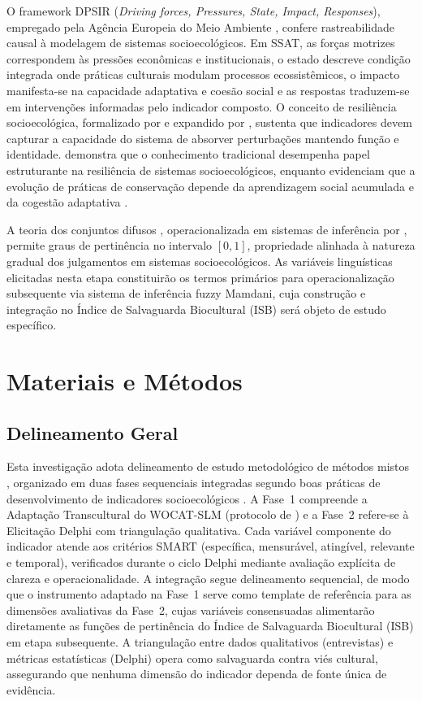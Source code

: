 \documentclass[3p,times]{elsarticle}
\begin{document}
O framework DPSIR (\textit{Driving forces, Pressures, State, Impact, Responses}), empregado pela Agência Europeia do Meio Ambiente \citep{Smeets1999}, confere rastreabilidade causal à modelagem de sistemas socioecológicos. Em SSAT, as forças motrizes correspondem às pressões econômicas e institucionais, o estado descreve condição integrada onde práticas culturais modulam processos ecossistêmicos, o impacto manifesta-se na capacidade adaptativa e coesão social e as respostas traduzem-se em intervenções informadas pelo indicador composto. O conceito de resiliência socioecológica, formalizado por \citet{Holling1973} e expandido por \citet{Folke2010}, sustenta que indicadores devem capturar a capacidade do sistema de absorver perturbações mantendo função e identidade. \citet{Folke2004} demonstra que o conhecimento tradicional desempenha papel estruturante na resiliência de sistemas socioecológicos, enquanto \citet{BerkesTurner2006} evidenciam que a evolução de práticas de conservação depende da aprendizagem social acumulada e da cogestão adaptativa \citep{OlssonFolkeBerkes2004}.

A teoria dos conjuntos difusos \citep{Zadeh1965}, operacionalizada em sistemas de inferência por \citet{Mamdani1975}, permite graus de pertinência no intervalo $[0,1]$, propriedade alinhada à natureza gradual dos julgamentos em sistemas socioecológicos. As variáveis linguísticas elicitadas nesta etapa constituirão os termos primários para operacionalização subsequente via sistema de inferência fuzzy Mamdani, cuja construção e integração no Índice de Salvaguarda Biocultural (ISB) será objeto de estudo específico.


\section{Materiais e Métodos}
\label{sec:methods}

\subsection{Delineamento Geral}

Esta investigação adota delineamento de estudo metodológico de métodos mistos \citep{Creswell2018}, organizado em duas fases sequenciais integradas segundo boas práticas de desenvolvimento de indicadores socioecológicos \citep{Dale2001,Niemeijer2008}. A Fase~1 compreende a Adaptação Transcultural do WOCAT-SLM (protocolo de \citet{Beaton2000}) e a Fase~2 refere-se à Elicitação Delphi com triangulação qualitativa. Cada variável componente do indicador atende aos critérios SMART (específica, mensurável, atingível, relevante e temporal), verificados durante o ciclo Delphi mediante avaliação explícita de clareza e operacionalidade. A integração segue delineamento sequencial, de modo que o instrumento adaptado na Fase~1 serve como template de referência para as dimensões avaliativas da Fase~2, cujas variáveis consensuadas alimentarão diretamente as funções de pertinência do Índice de Salvaguarda Biocultural (ISB) em etapa subsequente. A triangulação entre dados qualitativos (entrevistas) e métricas estatísticas (Delphi) opera como salvaguarda contra viés cultural, assegurando que nenhuma dimensão do indicador dependa de fonte única de evidência.
\end{document}
